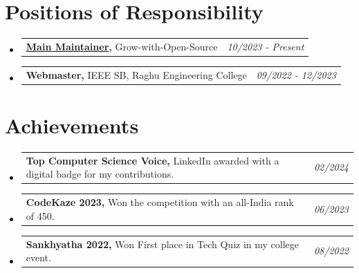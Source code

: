 \documentclass[a4paper,11pt]{article}
\makeatletter
\newcommand{\resumePOR}[3]{
\vspace{0.5mm}\item
    \begin{tabular*}{0.97\textwidth}[t]{l@{\extracolsep{\fill}}r}
        \textbf{#1}\hspace{0.3mm}#2 & \textit{\small{#3}} 
    \end{tabular*}
    \vspace{-2mm}
}
\newcommand{\resumeSubHeadingListStart}{\begin{itemize}[leftmargin=*,labelsep=0mm]}
\newcommand{\resumeSubHeadingListEnd}{\end{itemize}\vspace{2mm}}
\makeatother
\begin{document}
\section{\textbf{Positions of Responsibility}}
\vspace{-0.4mm}
\resumeSubHeadingListStart
\resumePOR{\href{https://github.com/Grow-with-Open-Source}{Main Maintainer}, } %
    {Grow-with-Open-Source} %
    {10/2023 - Present} %
\resumePOR{Webmaster, } %
    {IEEE SB, Raghu Engineering College} %
    {09/2022 - 12/2023} %
\resumeSubHeadingListEnd
\vspace{-4.75mm}




\section{\textbf{Achievements}}
\vspace{-0.4mm}
\resumeSubHeadingListStart
\resumePOR{Top Computer Science Voice, } %
    {LinkedIn awarded with a digital badge for my contributions.} %
    {02/2024} %

\resumePOR{CodeKaze 2023, } %
    {Won the competition with an all-India rank of 450.} %
    {06/2023} %
    
\resumePOR{Sankhyatha 2022, } %
    {Won First place in Tech Quiz in my college event.} %
    {08/2022} %
\resumeSubHeadingListEnd
\vspace{-7mm}


\end{document}
